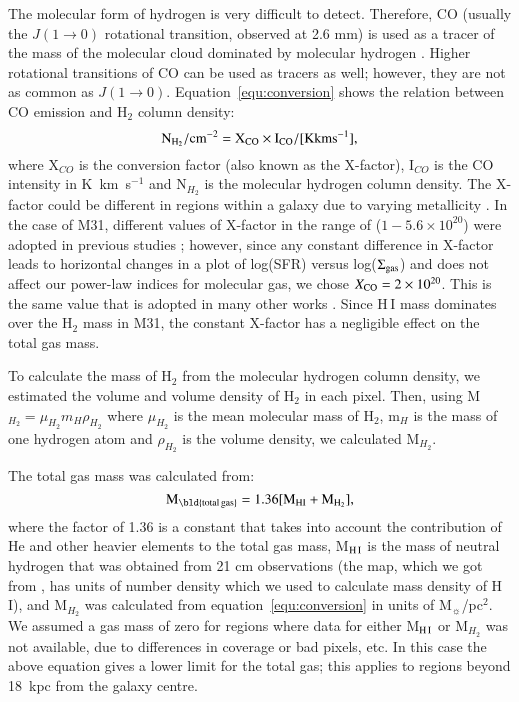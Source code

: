 The molecular form of hydrogen is very difficult to detect. Therefore, CO (usually the $J(1\rightarrow 0)$ rotational transition, observed at 2.6 mm) is used as a tracer of the mass of the molecular cloud dominated by molecular hydrogen \citep[see, for example,][]{Sanders84}. Higher rotational transitions of CO can be used as tracers as well; however, they are not as common as $J(1\rightarrow 0)$. Equation~\ref{equ:conversion} shows the relation between CO emission and H$_2$ column density:
\begin{equation}
\label{equ:conversion}
\rm N_{H_2}/\rm cm^{-2} = X_{CO} \times I_{CO}/[{\rm K km s^{-1}}],
\end{equation}
\noindent where X$_{CO}$ is the conversion factor (also known as the X-factor), I$_{CO}$ is the CO intensity in  K~km~s$^{-1}$ and N$_{H_2}$ is the molecular hydrogen column density. The X-factor could be different in regions within a galaxy due to varying metallicity \citep{Wilson95, Bosselli02, Bolato13}. In the case of M31, different values of X-factor in the range of ($1-5.6 \times 10^{20}$) were adopted in previous studies \citep[e.g.][]{Ford13, Bolato13, Leroy11, Bolato08, Nieten06}; however, since any constant difference in X-factor leads to horizontal changes in a plot of log(SFR) versus log($\Sigma_{\rm {gas}}$) and does not affect our power-law indices for molecular gas, we chose $X_{\rm {CO}}= 2 \times 10^{20}$. This is the same value that is adopted in many other works \citep[e.g.][]{Ford13, Smith12}. Since H\,{\sc I} mass dominates over the H$_2$ mass in M31, the constant X-factor has a negligible effect on the total gas mass.

To calculate the mass of H$_2$ from the molecular hydrogen column density, we estimated the volume and volume density of H$_2$ in each pixel. Then, using M$_{H_2} = \mu_{H_2}m_H\rho_{H_2}$ where $ \mu_{H_2}$ is the mean molecular mass of H$_2$, m$_H$ is the mass of one hydrogen atom and $\rho_{H_2}$ is the volume density, we calculated M$_{H_2}$. 

The total gas mass was calculated from:
\begin{equation}
\label{equ:total_gas}
\rm M_{\rm \bld {total \, gas}} = 1.36[M_{\rm H I}+M_{H_2}],
\end{equation}
\noindent where the factor of 1.36 is a constant that takes into account the contribution of He and other heavier elements to the total gas mass, M$_{\rm H\,{\sc I}}$ is the mass of neutral hydrogen that was obtained from 21 cm observations (the map, which we got from \citet{Chemin09}, has units of number density which we used to calculate mass density of H\,{\sc I}), and M$_{H_2}$ was calculated from equation~\ref{equ:conversion} in units of M$_{\sun}$/pc$^2$. We assumed a gas mass of zero for regions where data for  either M$_{\rm H\,{\sc I}}$ or M$_{H_2}$ was not available, due to differences in coverage or bad pixels, etc. In this case the above equation gives a lower limit for the total gas; this applies to regions beyond 18~kpc from the galaxy centre.

